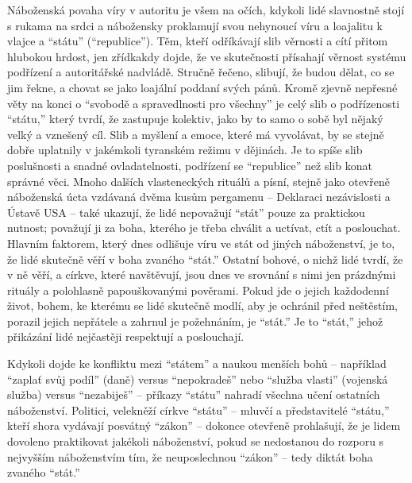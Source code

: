 \documentclass{book}
\begin{document}
Náboženská povaha víry v autoritu je všem na očích, kdykoli lidé slavnostně stojí s rukama na srdci a nábožensky proklamují svou nehynoucí víru a loajalitu k vlajce a \enquote{státu} (\enquote{republice}). Těm, kteří odříkávají slib věrnosti a cítí přitom hlubokou hrdost, jen zřídkakdy dojde, že ve skutečnosti přísahají věrnost systému podřízení a autoritářské nadvládě. Stručně řečeno, slibují, že budou dělat, co se jim řekne, a chovat se jako loajální poddaní svých pánů. Kromě zjevně nepřesné věty na konci o \enquote{svobodě a spravedlnosti pro všechny} je celý slib o podřízenosti \enquote{státu,} který tvrdí, že zastupuje kolektiv, jako by to samo o sobě byl nějaký velký a vznešený cíl. Slib a myšlení a emoce, které má vyvolávat, by se stejně dobře uplatnily v jakémkoli tyranském režimu v dějinách. Je to spíše slib poslušnosti a snadné ovladatelnosti, podřízení se \enquote{republice} než slib konat správné věci. Mnoho dalších vlasteneckých rituálů a písní, stejně jako otevřeně náboženská úcta vzdávaná dvěma kusům pergamenu -- Deklaraci nezávislosti a Ústavě USA -- také ukazují, že lidé nepovažují \enquote{stát} pouze za praktickou nutnost; považují ji za boha, kterého je třeba chválit a uctívat, ctít a poslouchat. Hlavním faktorem, který dnes odlišuje víru ve stát od jiných náboženství, je to, že lidé skutečně věří v boha zvaného \enquote{stát.} Ostatní bohové, o nichž lidé tvrdí, že v ně věří, a církve, které navštěvují, jsou dnes ve srovnání s nimi jen prázdnými rituály a polohlasně papouškovanými pověrami. Pokud jde o jejich každodenní život, bohem, ke kterému se lidé skutečně modlí, aby je ochránil před neštěstím, porazil jejich nepřátele a zahrnul je požehnáním, je \enquote{stát.} Je to \enquote{stát,} jehož přikázání lidé nejčastěji respektují a poslouchají.

Kdykoli dojde ke konfliktu mezi \enquote{státem} a naukou menších bohů -- například \enquote{zaplať svůj podíl} (daně) versus \enquote{nepokradeš} nebo \enquote{služba vlasti} (vojenská služba) versus \enquote{nezabiješ} -- příkazy \enquote{státu} nahradí všechna učení ostatních náboženství. Politici, velekněží církve \enquote{státu} -- mluvčí a představitelé \enquote{státu,} kteří shora vydávají posvátný \enquote{zákon} -- dokonce otevřeně prohlašují, že je lidem dovoleno praktikovat jakékoli náboženství, pokud se nedostanou do rozporu s nejvyšším náboženstvím tím, že neuposlechnou \enquote{zákon} -- tedy diktát boha zvaného \enquote{stát.}
\end{document}
